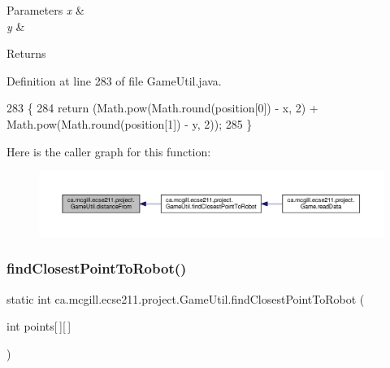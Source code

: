 \begin{DoxyParams}{Parameters}
{\em x} & \\
\hline
{\em y} & \\
\hline
\end{DoxyParams}
\begin{DoxyReturn}{Returns}

\end{DoxyReturn}


Definition at line 283 of file Game\+Util.\+java.


\begin{DoxyCode}
283                                                                      \{
284       \textcolor{keywordflow}{return} (Math.pow(Math.round(position[0]) - x, 2) + Math.pow(Math.round(position[1]) - y, 2));
285   \}
\end{DoxyCode}
Here is the caller graph for this function\+:
\nopagebreak
\begin{figure}[H]
\begin{center}
\leavevmode
\includegraphics[width=350pt]{classca_1_1mcgill_1_1ecse211_1_1project_1_1_game_util_a6fb324a3d5e42414c83dfd8bd5910b56_icgraph}
\end{center}
\end{figure}
\mbox{\label{classca_1_1mcgill_1_1ecse211_1_1project_1_1_game_util_a6e0ee94b800ca3727ca8009782abda14}} 
\subsubsection{\texorpdfstring{find\+Closest\+Point\+To\+Robot()}{findClosestPointToRobot()}}
{\footnotesize\ttfamily static int ca.\+mcgill.\+ecse211.\+project.\+Game\+Util.\+find\+Closest\+Point\+To\+Robot (\begin{DoxyParamCaption}\item[{int}]{points\mbox{[}$\,$\mbox{]}\mbox{[}$\,$\mbox{]} }\end{DoxyParamCaption})\hspace{0.3cm}{\ttfamily [static]}}

